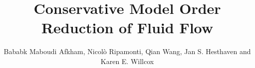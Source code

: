 \documentclass[graybox]{svmult}
\begin{document}
\title*{Conservative Model Order Reduction of Fluid Flow}
\author{Bababk Maboudi Afkham, Nicol\`o Ripamonti, Qian Wang, Jan S. Hesthaven and Karen E. Willcox}
%
%
\maketitle


\end{document}
